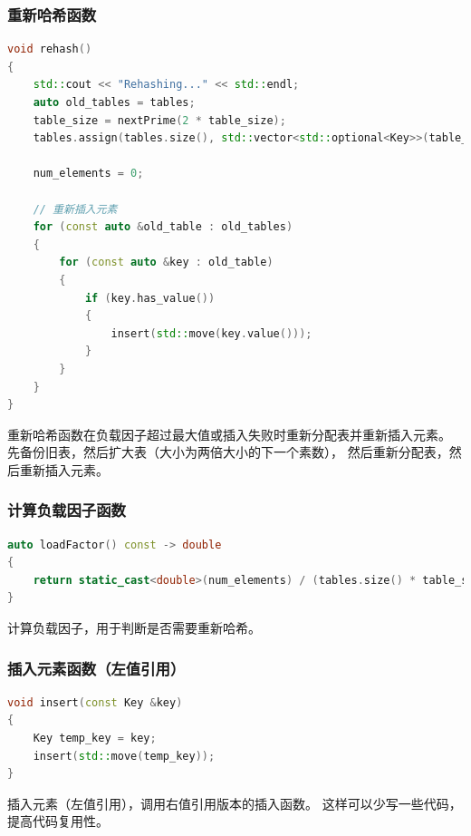 \documentclass[UTF8]{ctexart}
\begin{document}
\subsubsection{重新哈希函数}
\begin{lstlisting}[language=C++]
void rehash()
{
    std::cout << "Rehashing..." << std::endl;
    auto old_tables = tables;                                                  // 保存旧表
    table_size = nextPrime(2 * table_size);                                    // 扩大表
    tables.assign(tables.size(), std::vector<std::optional<Key>>(table_size)); // 重新分配表

    num_elements = 0;

    // 重新插入元素
    for (const auto &old_table : old_tables)
    {
        for (const auto &key : old_table)
        {
            if (key.has_value())
            {
                insert(std::move(key.value()));
            }
        }
    }
}
\end{lstlisting}
重新哈希函数在负载因子超过最大值或插入失败时重新分配表并重新插入元素。
先备份旧表，然后扩大表（大小为两倍大小的下一个素数），
然后重新分配表，然后重新插入元素。

\subsubsection{计算负载因子函数}
\begin{lstlisting}[language=C++]
auto loadFactor() const -> double
{
    return static_cast<double>(num_elements) / (tables.size() * table_size);
}
\end{lstlisting}
计算负载因子，用于判断是否需要重新哈希。

\subsubsection{插入元素函数（左值引用）}
\begin{lstlisting}[language=C++]
void insert(const Key &key)
{
    Key temp_key = key;
    insert(std::move(temp_key));
}
\end{lstlisting}
插入元素（左值引用），调用右值引用版本的插入函数。
这样可以少写一些代码，提高代码复用性。
\end{document}
